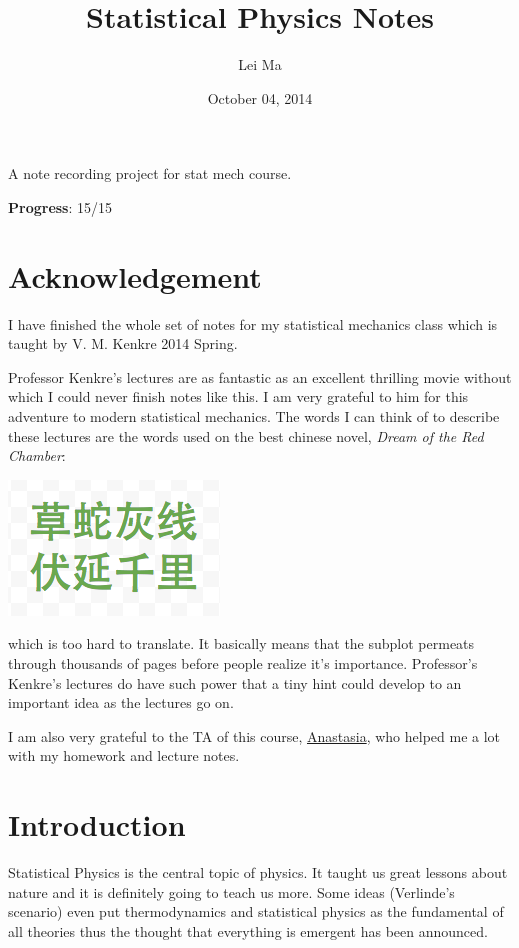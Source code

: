\documentclass[letterpaper,10pt,english]{sphinxmanual}
\title{Statistical Physics Notes}
\date{October 04, 2014}
\author{Lei Ma}
\begin{document}
\maketitle
\tableofcontents
{}\label{index::doc}


A note recording project for stat mech course.

\textbf{Progress}: 15/15


\chapter{Acknowledgement}
\label{index:statistical-mechanics}\label{index:acknowledgement}
I have finished the whole set of notes for my statistical mechanics class which is taught by V. M. Kenkre 2014 Spring.

Professor Kenkre's lectures are as fantastic as an excellent thrilling movie without which I could never finish notes like this. I am very grateful to him for this adventure to modern statistical mechanics. The words I can think of to describe these lectures are the words used on the best chinese novel, \emph{Dream of the Red Chamber}:

{\hfill\includegraphics{aComment.png}\hfill}

which is too hard to translate. It basically means that the subplot permeats through thousands of pages before people realize it's importance. Professor's Kenkre's lectures do have such power that a tiny hint could develop to an important idea as the lectures go on.

I am also very grateful to the TA of this course, \href{http://www.unm.edu/~aierides/505/}{Anastasia}, who helped me a lot with my homework and lecture notes.


\chapter{Introduction}
\label{index:introduction}
Statistical Physics is the central topic of physics. It taught us great lessons about nature and it is definitely going to teach us more. Some ideas (Verlinde's scenario) even put thermodynamics and statistical physics as the fundamental of all theories thus the thought that everything is emergent has been announced.
\end{document}
